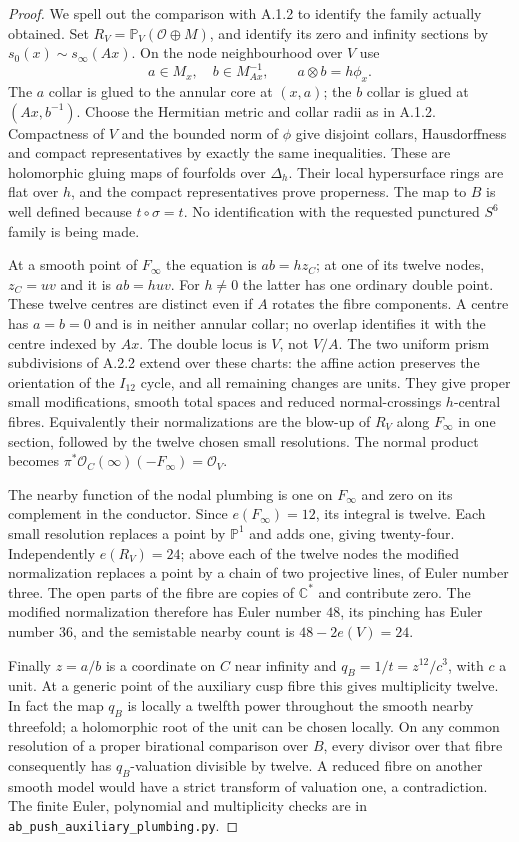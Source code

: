 \begin{proof}
We spell out the comparison with A.1.2
to identify the family actually obtained.
Set $R_V=\mathbb P_V(\mathcal O\oplus M)$,
and identify its zero and infinity
sections by $s_0(x)\sim s_\infty(Ax)$.
On the node neighbourhood over $V$ use
\[
 a\in M_x,\quad b\in M_{Ax}^{-1},
 \qquad a\otimes b=h\phi_x.
\]
The $a$ collar is glued to the annular
core at $(x,a)$; the $b$ collar is glued
at $(Ax,b^{-1})$. Choose the Hermitian
metric and collar radii as in A.1.2.
Compactness of $V$ and the bounded norm
of $\phi$ give disjoint collars,
Hausdorffness and compact representatives
by exactly the same inequalities.
These are holomorphic gluing maps of
fourfolds over $\Delta_h$.
Their local hypersurface rings are flat
over $h$, and the compact representatives
prove properness. The map to $B$ is
well defined because $t\circ\sigma=t$.
No identification with the requested
punctured $S^6$ family is being made.

At a smooth point of $F_\infty$ the
equation is $ab=hz_C$; at one of its
twelve nodes, $z_C=uv$ and it is
$ab=huv$. For $h\ne0$ the latter
has one ordinary double point.
These twelve centres are distinct
even if $A$ rotates the fibre
components. A centre has $a=b=0$
and is in neither annular collar;
no overlap identifies it with the
centre indexed by $Ax$.
The double locus is $V$, not $V/A$.
The two uniform prism subdivisions
of A.2.2 extend over these charts:
the affine action preserves the
orientation of the $I_{12}$ cycle,
and all remaining changes are units.
They give proper small modifications,
smooth total spaces and reduced
normal-crossings $h$-central fibres.
Equivalently their normalizations are
the blow-up of $R_V$ along $F_\infty$
in one section, followed by the twelve
chosen small resolutions. The normal
product becomes
$\pi^*\mathcal O_C(\infty)(-F_\infty)=\mathcal O_V$.

The nearby function of the nodal
plumbing is one on $F_\infty$ and
zero on its complement in the conductor.
Since $e(F_\infty)=12$, its integral
is twelve. Each small resolution
replaces a point by $\mathbb P^1$
and adds one, giving twenty-four.
Independently $e(R_V)=24$; above each
of the twelve nodes the modified
normalization replaces a point by
a chain of two projective lines,
of Euler number three. The open
parts of the fibre are copies of
$\mathbb C^*$ and contribute zero.
The modified normalization therefore
has Euler number $48$, its pinching
has Euler number $36$, and the
semistable nearby count is
$48-2e(V)=24$.

Finally $z=a/b$ is a coordinate on
$C$ near infinity and
$q_B=1/t=z^{12}/c^3$, with $c$ a unit.
At a generic point of the auxiliary
cusp fibre this gives multiplicity
twelve. In fact the map $q_B$ is
locally a twelfth power throughout
the smooth nearby threefold; a
holomorphic root of the unit can
be chosen locally. On any common
resolution of a proper birational
comparison over $B$, every divisor
over that fibre consequently has
$q_B$-valuation divisible by twelve.
A reduced fibre on another smooth
model would have a strict transform
of valuation one, a contradiction.
The finite Euler, polynomial and
multiplicity checks are in
\texttt{ab\_push\_auxiliary\_plumbing.py}.
\end{proof}

